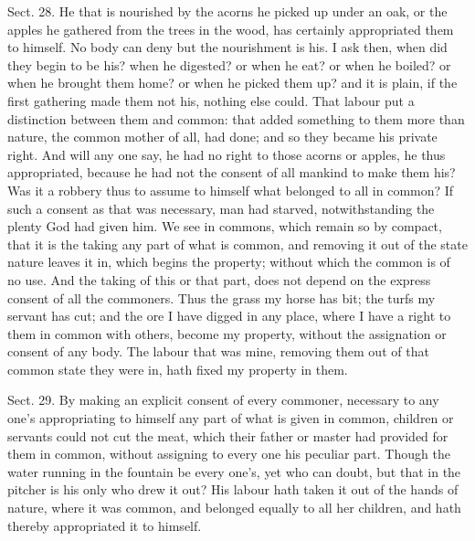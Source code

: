 \documentclass[11pt,openany]{book}
\begin{document}
Sect. 28. He that is nourished by the acorns he picked up under an oak, or the apples he gathered from the trees in the wood, has certainly appropriated them to himself. No body can deny but the nourishment is his. I ask then, when did they begin to be his? when he digested? or when he eat? or when he boiled? or when he brought them home? or when he picked them up? and it is plain, if the first gathering made them not his, nothing else could. That labour put a distinction between them and common: that added something to them more than nature, the common mother of all, had done; and so they became his private right. And will any one say, he had no right to those acorns or apples, he thus appropriated, because he had not the consent of all mankind to make them his? Was it a robbery thus to assume to himself what belonged to all in common? If such a consent as that was necessary, man had starved, notwithstanding the plenty God had given him. We see in commons, which remain so by compact, that it is the taking any part of what is common, and removing it out of the state nature leaves it in, which begins the property; without which the common is of no use. And the taking of this or that part, does not depend on the express consent of all the commoners. Thus the grass my horse has bit; the turfs my servant has cut; and the ore I have digged in any place, where I have a right to them in common with others, become my property, without the assignation or consent of any body. The labour that was mine, removing them out of that common state they were in, hath fixed my property in them.

Sect. 29. By making an explicit consent of every commoner, necessary to any one's appropriating to himself any part of what is given in common, children or servants could not cut the meat, which their father or master had provided for them in common, without assigning to every one his peculiar part. Though the water running in the fountain be every one's, yet who can doubt, but that in the pitcher is his only who drew it out? His labour hath taken it out of the hands of nature, where it was common, and belonged equally to all her children, and hath thereby appropriated it to himself.
\end{document}
